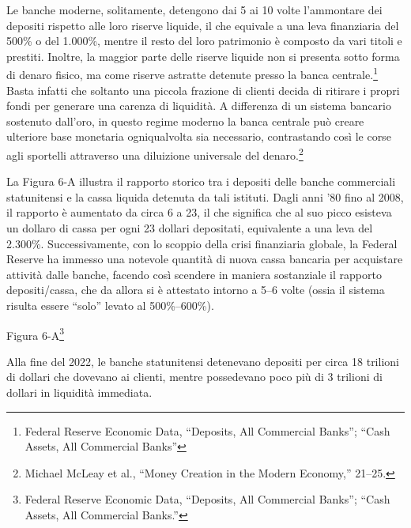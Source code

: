 \documentclass[
  a5paper,
  smalldemyvopaper,10pt,twoside,onecolumn,openright,extrafontsizes,hidelinks]{memoir}
\begin{document}
Le banche moderne, solitamente, detengono dai 5 ai 10 volte l'ammontare
dei depositi rispetto alle loro riserve liquide, il che equivale a una
leva finanziaria del 500\% o del 1.000\%, mentre il resto del loro
patrimonio è composto da vari titoli e prestiti. Inoltre, la maggior
parte delle riserve liquide non si presenta sotto forma di denaro
fisico, ma come riserve astratte detenute presso la banca
centrale.\footnote{Federal Reserve Economic Data, ``Deposits, All
  Commercial Banks''; ``Cash Assets, All Commercial Banks''} Basta
infatti che soltanto una piccola frazione di clienti decida di ritirare
i propri fondi per generare una carenza di liquidità. A differenza di un
sistema bancario sostenuto dall'oro, in questo regime moderno la banca
centrale può creare ulteriore base monetaria ogniqualvolta sia
necessario, contrastando così le corse agli sportelli attraverso una
diluizione universale del denaro.\footnote{Michael McLeay et al.,
  ``Money Creation in the Modern Economy,'' 21--25.}

La Figura 6-A illustra il rapporto storico tra i depositi delle banche
commerciali statunitensi e la cassa liquida detenuta da tali istituti.
Dagli anni '80 fino al 2008, il rapporto è aumentato da circa 6 a 23, il
che significa che al suo picco esisteva un dollaro di cassa per ogni 23
dollari depositati, equivalente a una leva del 2.300\%. Successivamente,
con lo scoppio della crisi finanziaria globale, la Federal Reserve ha
immesso una notevole quantità di nuova cassa bancaria per acquistare
attività dalle banche, facendo così scendere in maniera sostanziale il
rapporto depositi/cassa, che da allora si è attestato intorno a 5--6
volte (ossia il sistema risulta essere ``solo'' levato al 500\%--600\%).

Figura 6-A\footnote{Federal Reserve Economic Data, ``Deposits, All
  Commercial Banks''; ``Cash Assets, All Commercial Banks.''}

Alla fine del 2022, le banche statunitensi detenevano depositi per circa
18 trilioni di dollari che dovevano ai clienti, mentre possedevano poco
più di 3 trilioni di dollari in liquidità immediata.
\end{document}
